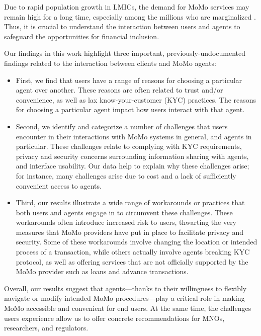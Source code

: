 Due to rapid population growth in LMICs, the demand for MoMo services may remain high for a long time, especially among the millions who are marginalized \cite{awanis2022state}. Thus, it is crucial to understand the interaction between users and agents to safeguard the opportunities for financial inclusion.

Our findings in this work highlight three important, previously-undocumented findings related to the interaction between clients and MoMo agents:
\begin{itemize} %
    \item First, we find that users have a range of reasons for choosing a particular agent over another. These reasons are often related to trust and/or convenience, as well as lax know-your-customer (KYC) practices. The reasons for choosing a particular agent impact how users interact with that agent.
    \item Second, we identify and categorize a number of challenges that users encounter in their interactions with MoMo systems in general, and agents in particular. These challenges relate to complying with KYC requirements, privacy and security concerns surrounding information sharing with agents, and interface usability. Our data help to explain why these challenges arise; for instance, many challenges arise due to cost and a lack of sufficiently convenient access to agents. 
    \item Third, our results illustrate a wide range of workarounds or practices that both users and agents engage in to circumvent these challenges. These workarounds often introduce increased  risk to users, thwarting the very measures that MoMo providers have put in place to facilitate privacy and security. Some of these workarounds involve changing the location or intended process of a transaction, while others actually involve agents breaking KYC protocol, as well as offering services that are not officially supported by the MoMo provider such as loans and advance transactions. 

\end{itemize}

Overall, our results suggest that agents---thanks to their willingness to flexibly navigate or modify intended MoMo procedures---play a critical role in making MoMo accessible and convenient for end users. At the same time, the challenges users experience allow us to offer concrete recommendations for MNOs, researchers, and regulators. 

